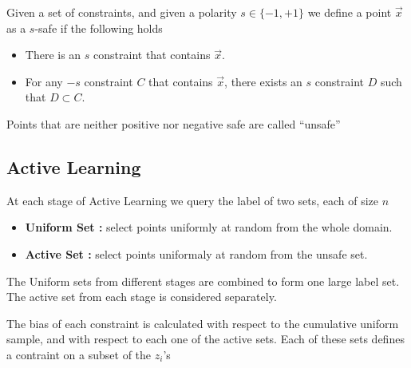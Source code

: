 \documentclass{article}
\newcommand{\x}{\vec{x}}
\begin{document}
Given a set of constraints, and given a polarity  $s \in
\{-1,+1\}$ we define a point $\x$ as a $s$-safe if
the following holds
\begin{itemize}
\item There is an $s$ constraint that contains $\x$.
\item For any $-s$ constraint $C$ that contains $\x$, there exists an
  $s$ constraint $D$ such that $D \subset C$. 
\end{itemize}

Points that are neither positive nor negative safe are called
``unsafe''

\subsection{Active Learning}

At each stage of Active Learning we query the label of two sets, each
of size $n$
\begin{itemize}
\item {\bf Uniform Set :} select points uniformly at random from the whole
  domain.
\item {\bf Active Set :} select points uniformaly at random from the unsafe
  set.
\end{itemize}

The Uniform sets from different stages are combined to form one
large label set. The active set from each stage is considered
separately.

The bias of each constraint is calculated with respect to the
cumulative uniform sample, and with respect to each one of the active
sets. Each of these sets defines a contraint on a subset of the $z_i$'s 
\end{document}
